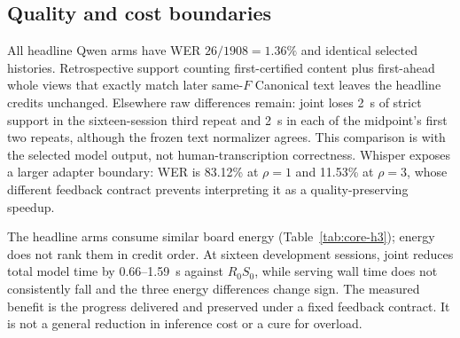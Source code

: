 \subsection{Quality and cost boundaries}
All headline Qwen arms have WER $26/1908=1.36\%$ and identical selected
histories. Retrospective support counting first-certified content plus
first-ahead whole views that exactly match later same-$F$ Canonical
text leaves the headline credits unchanged. Elsewhere raw differences
remain: joint loses 2~s of strict support in the sixteen-session third
repeat and 2~s in each of the midpoint's first two repeats, although
the frozen text normalizer agrees. This comparison is with the selected
model output, not human-transcription correctness. Whisper exposes a
larger adapter boundary: WER is 83.12\% at $\rho=1$ and 11.53\% at
$\rho=3$, whose different feedback contract prevents interpreting it
as a quality-preserving speedup.

The headline arms consume similar board energy (Table~\ref{tab:core-h3});
energy does not rank them in credit order. At sixteen development
sessions, joint reduces total model time by 0.66--1.59~s against $R_0S_0$,
while serving wall time does not consistently fall and the
three energy differences change sign. The measured benefit is the
progress delivered and preserved under a fixed feedback contract.
It is not a general reduction in inference cost or a cure for overload.
